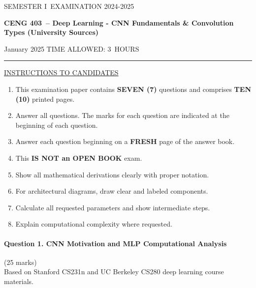 \documentclass[12pt]{article}
\newcommand{\masunitnumber}{CENG 403}
\newcommand{\examdate}{January 2025}
\newcommand{\academicyear}{2024-2025}
\newcommand{\semester}{I}
\newcommand{\coursename}{Deep Learning - CNN Fundamentals \& Convolution Types (University Sources)}
\newcommand{\numberofhours}{3}
\begin{document}
\setlength{\headsep}{5truemm}
\setlength{\headheight}{14.5truemm}
\setlength{\voffset}{-0.45truein}
\renewcommand{\headrulewidth}{0.0pt}
\begin{center}
SEMESTER \semester\ EXAMINATION \academicyear
\end{center}
\begin{center}
{\bf \masunitnumber\ -- \coursename}
\end{center}
\vspace{20truemm}
\noindent \examdate\hspace{45truemm} TIME ALLOWED: \numberofhours\ HOURS
\vspace{19truemm}
\hrule
\vspace{19truemm}
\noindent\underline{INSTRUCTIONS TO CANDIDATES}
\vspace{8truemm}
\begin{enumerate}
\item This examination paper contains {\bf SEVEN (7)} questions and comprises 
{\bf TEN (10)} printed pages.
\item Answer all questions. 
The marks for each question are indicated at the beginning of each question.
\item Answer each question beginning on a {\bf FRESH} page of the answer book.
\item This {\bf IS NOT an OPEN BOOK} exam.
\item Show all mathematical derivations clearly with proper notation.
\item For architectural diagrams, draw clear and labeled components.
\item Calculate all requested parameters and show intermediate steps.
\item Explain computational complexity where requested.
\end{enumerate}
\newpage
\lhead{}
\rhead{\masunitnumber}
\chead{}
\lfoot{}
\cfoot{\thepage}
\rfoot{}
\setlength{\footskip}{45pt}

\paragraph{Question 1. CNN Motivation and MLP Computational Analysis}{{\hfill (25 marks)}}\\
Based on Stanford CS231n and UC Berkeley CS280 deep learning course materials.
\end{document}
